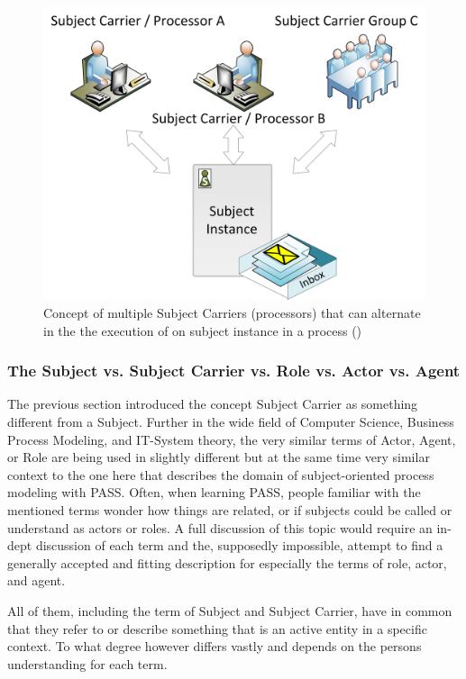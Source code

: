 \begin{figure}[htbp]
	\centering
	\includegraphics[width=0.6\linewidth]{Figures/SubjectCarrierConcept2.png}
	\caption[Concept of multiple Subject Carriers (processors) that can alternate in the the execution of on subject instance in a process (\cite{elstermann:diss})]{Concept of multiple Subject Carriers (processors) that can alternate in the the execution of on subject instance in a process (\cite{elstermann:diss})}
	\label{fig:subjectCarrierConcept2}
\end{figure}

\subsubsection{The Subject vs. Subject Carrier vs. Role vs. Actor vs. Agent}


The previous section introduced the concept Subject Carrier as something different from a Subject. Further in the wide field of Computer Science, Business Process Modeling, and IT-System theory, the very similar terms of Actor, Agent, or Role are being used in slightly different but at the same time very similar context to the one here that describes the domain of subject-oriented process modeling with PASS. Often, when learning PASS, people familiar with the mentioned terms wonder how things are related, or if subjects could be called or understand as actors or roles. 
A full discussion of this topic would require an in-dept discussion of each term and the, supposedly impossible, attempt to find a generally accepted and fitting description for especially the terms of role, actor, and agent. 

All of them, including the term of Subject and Subject Carrier, have in common that they refer to or describe something that is an active entity in a specific context. To what degree however differs vastly and depends on the persons understanding for each term. 

